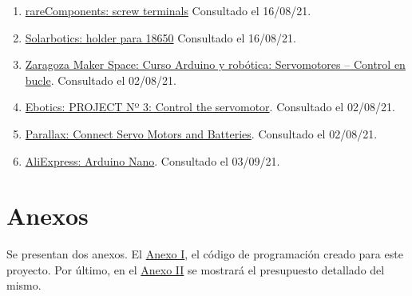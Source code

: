 \documentclass[12pt]{article}
\begin{document}
\begin{enumerate}
				
				
				\item 
				\label{bib: rarecomponents screw}
				\href{https://rarecomponents.com/store/1219}{rareComponents: screw terminals} Consultado el 16/08/21.
				
				\item 
				\label{bib: solarbotics holder para 18650}
				\href{https://solarbotics.com/product/600058/}{Solarbotics: holder para 18650} Consultado el 16/08/21.
				
				\item
				\label{zaragoza maker arduino y servo curso}
				\href{https://zaragozamakerspace.com/index.php/lessons/curso-arduino-y-robotica-servomotores/}{Zaragoza Maker Space: Curso Arduino y robótica: Servomotores – Control en bucle}. Consultado el 02/08/21.
			
				\item
				\label{ebotics servo parts}
				\href{https://ebotics.com/activity/project-no-3-control-the-servomotor/}{Ebotics: PROJECT Nº 3: Control the servomotor}. Consultado el 02/08/21.
				
				\item
				\label{parallex servo}
				\href{https://learn.parallax.com/tutorials/robot/shield-bot/robotics-board-education-shield-arduino/chapter-2-shield-lights-servo-10}{Parallax: Connect Servo Motors and Batteries}. Consultado el 02/08/21.
				
				\item
				\label{arduino nano front and rear}
				\href{https://es.aliexpress.com/item/898608940.html}{AliExpress: Arduino Nano}. Consultado el 03/09/21.
		
			\end{enumerate}

	\pagebreak
	
	\section*{Anexos}
	
	\noindent Se presentan dos anexos. El \hyperref[anexo I: codigo]{Anexo I}, el código de programación creado para este proyecto. Por último, en el \hyperref[anexo II: presupuesto]{Anexo II} se mostrará el presupuesto detallado del mismo. \\
	
\end{document}
